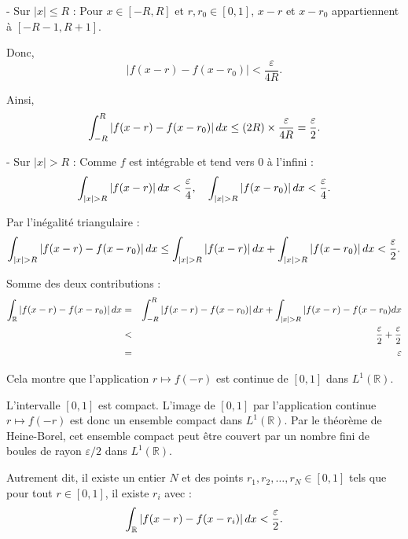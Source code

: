 - Sur $|x| \leq R$ : Pour $x \in [- R, R]$ et $r, r_0 \in [0, 1]$, $x - r$ et
$x - r_0$ appartiennent {\`a} $[- R - 1, R + 1]$.

Donc,
\[ |f (x - r) - f (x - r_0) | < \frac{\varepsilon}{4 R} . \]


Ainsi,
\[ \int_{- R}^R |f (x - r) - f (x - r_0) |  \hspace{0.17em} dx \leq (2 R)
   \times \frac{\varepsilon}{4 R} = \frac{\varepsilon}{2} . \]


- Sur $|x| > R$ : Comme $f$ est int{\'e}grable et tend vers 0 {\`a} l'infini :
\[ \int_{|x| > R} |f (x - r) |  \hspace{0.17em} dx < \frac{\varepsilon}{4},
   \quad \int_{|x| > R} |f (x - r_0) |  \hspace{0.17em} dx <
   \frac{\varepsilon}{4} . \]


Par l'in{\'e}galit{\'e} triangulaire :
\[ \int_{|x| > R} |f (x - r) - f (x - r_0) | \hspace{0.17em} dx \leq \int_{|x|
   > R} |f (x - r) | \hspace{0.17em} dx + \int_{|x| > R} |f (x - r_0) | 
   \hspace{0.17em} dx < \frac{\varepsilon}{2} . \]


Somme des deux contributions :
\begin{eqnarray*}
  \int_{\mathbb{R}} |f (x - r) - f (x - r_0) | \hspace{0.17em} dx & = & 
  \int_{- R}^R | f (x - r) - f (x - r_0) |  \hspace{0.17em} dx + \int_{|x| >
  R} | f (x - r) - f (x - r_0) d x\\
  & < & \frac{\varepsilon}{2} + \frac{\varepsilon}{2}\\
  & = & \varepsilon
\end{eqnarray*}


Cela montre que l'application $r \mapsto f (- r)$ est continue de $[0, 1]$
dans $L^1 (\mathbb{R})$.

L'intervalle $[0, 1]$ est compact. L'image de $[0, 1]$ par l'application
continue $r \mapsto f (- r)$ est donc un ensemble compact dans $L^1
(\mathbb{R})$. Par le th{\'e}or{\`e}me de Heine-Borel, cet ensemble compact
peut {\^e}tre couvert par un nombre fini de boules de rayon $\varepsilon / 2$
dans $L^1 (\mathbb{R})$.

Autrement dit, il existe un entier $N$ et des points $r_1, r_2, \ldots, r_N
\in [0, 1]$ tels que pour tout $r \in [0, 1]$, il existe $r_i$ avec :
\[ \int_{\mathbb{R}} |f (x - r) - f (x - r_i) |  \hspace{0.17em} dx <
   \frac{\varepsilon}{2} . \]


